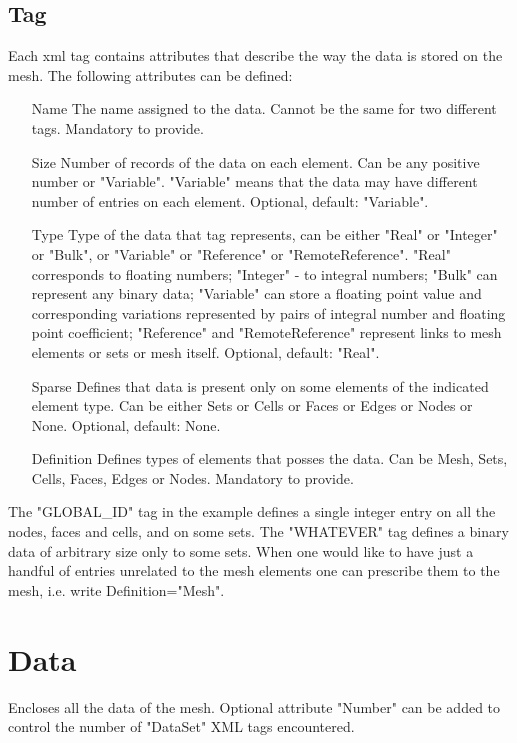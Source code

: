 \documentclass[14pt]{article}
\begin{document}
\subsection{Tag}
Each xml tag contains attributes that describe the way the data is stored on the mesh. The following attributes can be defined:
\begin{itemize}
\item[Name] The name assigned to the data. Cannot be the same for two different tags. Mandatory to provide.
\item[Size] Number of records of the data on each element. Can be any positive number or "Variable". "Variable" means that the data may have different number of entries on each element. Optional, default: "Variable".
\item[Type] Type of the data that tag represents, can be either "Real" or "Integer" or "Bulk", or "Variable" or "Reference" or "RemoteReference". "Real" corresponds to floating numbers; "Integer" - to integral numbers; "Bulk" can represent any binary data; "Variable" can store a floating point value and corresponding variations represented by pairs of integral number and floating point coefficient; "Reference" and "RemoteReference" represent links to mesh elements or sets or mesh itself. Optional, default: "Real".
\item[Sparse] Defines that data is present only on some elements of the indicated element type. Can be either Sets or Cells or Faces or Edges or Nodes or None. Optional, default: None.
\item[Definition] Defines types of elements that posses the data. Can be Mesh, Sets, Cells, Faces, Edges or Nodes. Mandatory to provide.
\end{itemize}
The "GLOBAL\_ID" tag in the example defines a single integer entry on all the nodes, faces and cells, and on some sets. The "WHATEVER" tag defines a binary data of arbitrary size only to some sets. When one would like to have just a handful of entries unrelated to the mesh elements one can prescribe them to the mesh, i.e. write Definition="Mesh".

\section{Data}
Encloses all the data of the mesh. Optional attribute "Number" can be added to control the number of "DataSet" XML tags encountered.
\end{document}
